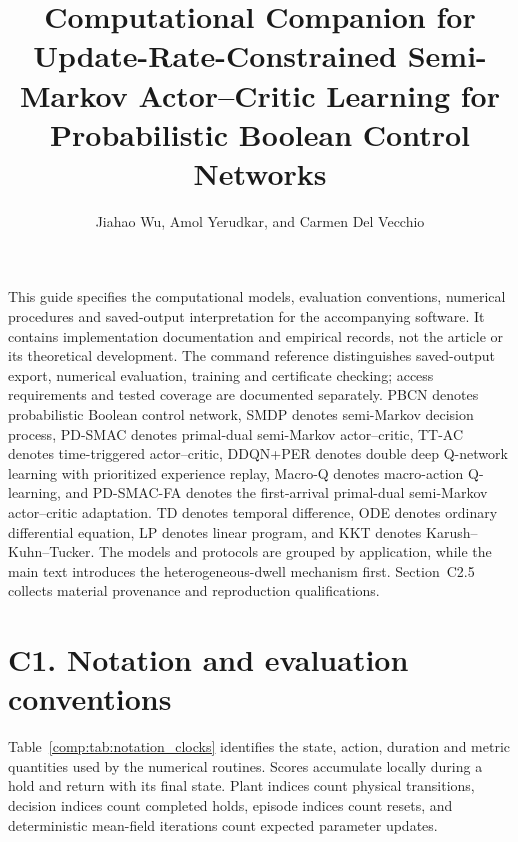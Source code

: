 \documentclass[11pt]{article}
\title{Computational Companion for\\[0.5ex]
\large Update-Rate-Constrained Semi-Markov Actor--Critic Learning for Probabilistic Boolean Control Networks}
\author{Jiahao Wu, Amol Yerudkar, and Carmen Del Vecchio}
\date{}
\newcommand{\1}{\mathbf{1}}
\begin{document}
\maketitle

\noindent
This guide specifies the computational models, evaluation conventions, numerical procedures and saved-output interpretation for the accompanying software. It contains implementation documentation and empirical records, not the article or its theoretical development. The command reference distinguishes saved-output export, numerical evaluation, training and certificate checking; access requirements and tested coverage are documented separately. PBCN denotes probabilistic Boolean control network, SMDP denotes semi-Markov decision process, PD-SMAC denotes primal-dual semi-Markov actor--critic, TT-AC denotes time-triggered actor--critic, DDQN+PER denotes double deep Q-network learning with prioritized experience replay, Macro-Q denotes macro-action Q-learning, and PD-SMAC-FA denotes the first-arrival primal-dual semi-Markov actor--critic adaptation. TD denotes temporal difference, ODE denotes ordinary differential equation, LP denotes linear program, and KKT denotes Karush--Kuhn--Tucker. The models and protocols are grouped by application, while the main text introduces the heterogeneous-dwell mechanism first. Section~C2.5 collects material provenance and reproduction qualifications.

\section*{C1. Notation and evaluation conventions}
\label{comp:sec:notation}

Table~\ref{comp:tab:notation_clocks} identifies the state, action, duration and metric quantities used by the numerical routines. Scores accumulate locally during a hold and return with its final state. Plant indices count physical transitions, decision indices count completed holds, episode indices count resets, and deterministic mean-field iterations count expected parameter updates.
\end{document}
